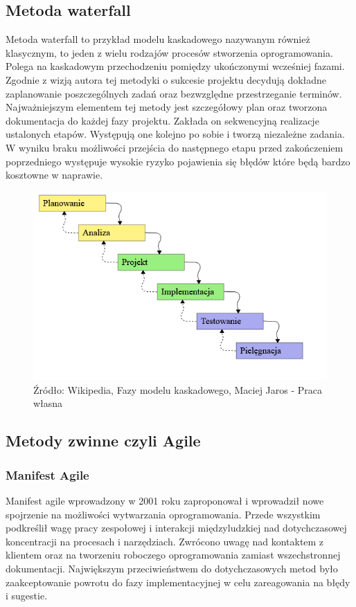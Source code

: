 \documentclass[oneside,polski,logo]{amuthesis}
\begin{document}
\subsection {Metoda waterfall}
Metoda waterfall to przykład modelu kaskadowego nazywanym również klasycznym, to jeden z wielu rodzajów procesów stworzenia oprogramowania. Polega na kaskadowym przechodzeniu pomiędzy ukończonymi wcześniej fazami. Zgodnie z wizją autora tej metodyki o sukcesie projektu decydują dokładne zaplanowanie poszczególnych zadań oraz bezwzględne przestrzeganie terminów. Najważniejszym elementem tej metody jest szczegółowy plan oraz tworzona dokumentacja do każdej fazy projektu. Zakłada on sekwencyjną realizacje ustalonych etapów. Występują one kolejno po sobie i tworzą niezależne zadania. W wyniku braku możliwości przejścia do następnego etapu przed zakończeniem poprzedniego występuje wysokie ryzyko pojawienia się błędów które będą bardzo kosztowne w naprawie.\cite{waterfall}\\


\begin{figure}[h]
	\centering
	\includegraphics[width=15cm]{images/hyps/waterfall.png}
	\caption{Źródło: Wikipedia, Fazy modelu kaskadowego, Maciej Jaros - Praca własna}
\end{figure}

\subsection{Metody zwinne czyli Agile}

\subsubsection{Manifest Agile}
Manifest agile wprowadzony w 2001 roku zaproponował i wprowadził nowe spojrzenie na możliwości wytwarzania oprogramowania. Przede wszystkim podkreślił wagę pracy zespołowej i interakcji międzyludzkiej nad dotychczasowej koncentracji na procesach i narzędziach. Zwrócono uwagę nad kontaktem z klientem oraz na tworzeniu roboczego oprogramowania zamiast wszechstronnej dokumentacji. Największym przeciwieństwem do dotychczasowych metod było zaakceptowanie powrotu do fazy implementacyjnej w celu zareagowania na błędy i sugestie.\cite{agile}\\ \\
\end{document}
